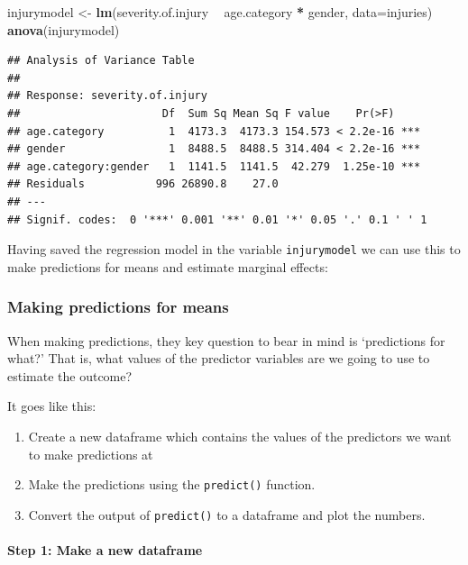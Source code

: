 \documentclass[]{article}
\newenvironment{Shaded}{\begin{snugshade}}{\end{snugshade}}
\newcommand{\KeywordTok}[1]{\textcolor[rgb]{0.13,0.29,0.53}{\textbf{#1}}}
\newcommand{\DataTypeTok}[1]{\textcolor[rgb]{0.13,0.29,0.53}{#1}}
\newcommand{\StringTok}[1]{\textcolor[rgb]{0.31,0.60,0.02}{#1}}
\newcommand{\OperatorTok}[1]{\textcolor[rgb]{0.81,0.36,0.00}{\textbf{#1}}}
\newcommand{\NormalTok}[1]{#1}
\providecommand{\tightlist}{%
  \setlength{\itemsep}{0pt}\setlength{\parskip}{0pt}}
\let\oldparagraph\paragraph
\renewcommand{\paragraph}[1]{\oldparagraph{#1}\mbox{}}
\theoremstyle{definition}
\theoremstyle{definition}
\theoremstyle{definition}
\theoremstyle{remark}
\begin{document}
\begin{Shaded}
\begin{Highlighting}[]
\NormalTok{injurymodel <-}\StringTok{ }\KeywordTok{lm}\NormalTok{(severity.of.injury }\OperatorTok{~}\StringTok{ }\NormalTok{age.category }\OperatorTok{*}\StringTok{ }\NormalTok{gender,  }\DataTypeTok{data=}\NormalTok{injuries)}
\KeywordTok{anova}\NormalTok{(injurymodel)}
\end{Highlighting}
\end{Shaded}

\begin{verbatim}
## Analysis of Variance Table
## 
## Response: severity.of.injury
##                      Df  Sum Sq Mean Sq F value    Pr(>F)    
## age.category          1  4173.3  4173.3 154.573 < 2.2e-16 ***
## gender                1  8488.5  8488.5 314.404 < 2.2e-16 ***
## age.category:gender   1  1141.5  1141.5  42.279  1.25e-10 ***
## Residuals           996 26890.8    27.0                      
## ---
## Signif. codes:  0 '***' 0.001 '**' 0.01 '*' 0.05 '.' 0.1 ' ' 1
\end{verbatim}

Having saved the regression model in the variable \texttt{injurymodel}
we can use this to make predictions for means and estimate marginal
effects:

\subsubsection*{Making predictions for
means}\label{making-predictions-for-means}

When making predictions, they key question to bear in mind is
`predictions for what?' That is, what values of the predictor variables
are we going to use to estimate the outcome?

It goes like this:

\begin{enumerate}
\def\labelenumi{\arabic{enumi}.}
\tightlist
\item
  Create a new dataframe which contains the values of the predictors we
  want to make predictions at
\item
  Make the predictions using the \texttt{predict()} function.
\item
  Convert the output of \texttt{predict()} to a dataframe and plot the
  numbers.
\end{enumerate}

\paragraph{Step 1: Make a new
dataframe}\label{step-1-make-a-new-dataframe}
\end{document}
